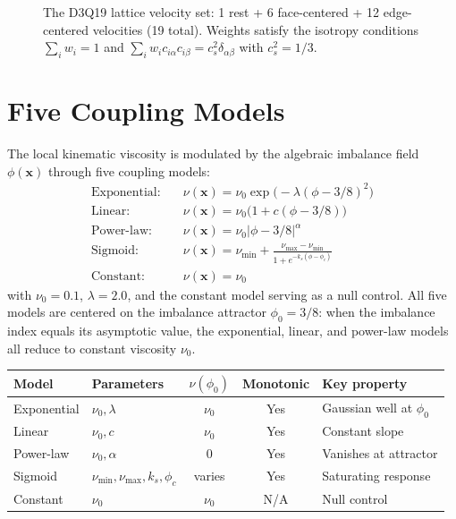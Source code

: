 \documentclass[12pt,openany]{report}
\theoremstyle{definition}
\theoremstyle{plain}
\theoremstyle{remark}
\begin{document}
\begin{figure}[htbp]
\centering

\caption{The D3Q19 lattice velocity set: 1 rest + 6 face-centered + 12
edge-centered velocities (19 total).  Weights satisfy the isotropy conditions
$\sum_i w_i = 1$ and $\sum_i w_i c_{i\alpha} c_{i\beta} = c_s^2
\delta_{\alpha\beta}$ with $c_s^2 = 1/3$.}
\label{fig:d3q19}
\end{figure}

\section{Five Coupling Models}
\label{sec:coupling-models}

The local kinematic viscosity is modulated by the algebraic imbalance
field $\phi(\mathbf{x})$ through five coupling models:
\begin{align}
  \text{Exponential:} \quad & \nu(\mathbf{x}) = \nu_0 \exp\bigl(-\lambda
    (\phi - 3/8)^2\bigr) \label{eq:coupling-exp} \\
  \text{Linear:} \quad & \nu(\mathbf{x}) = \nu_0 \bigl(1 + c(\phi - 3/8)\bigr) \\
  \text{Power-law:} \quad & \nu(\mathbf{x}) = \nu_0 |\phi - 3/8|^{\alpha} \\
  \text{Sigmoid:} \quad & \nu(\mathbf{x}) = \nu_{\min} +
    \frac{\nu_{\max} - \nu_{\min}}{1 + e^{-k_s(\phi - \phi_c)}} \\
  \text{Constant:} \quad & \nu(\mathbf{x}) = \nu_0
\end{align}
with $\nu_0 = 0.1$, $\lambda = 2.0$, and the constant model serving as a
null control.  All five models are centered on the imbalance attractor
$\phi_0 = 3/8$: when the imbalance index equals its asymptotic value, the
exponential, linear, and power-law models all reduce to constant
viscosity $\nu_0$.

\begin{center}
\begin{tabular}{llccl}
\toprule
\textbf{Model} & \textbf{Parameters} & $\nu(\phi_0)$ & \textbf{Monotonic} & \textbf{Key property} \\
\midrule
Exponential & $\nu_0, \lambda$ & $\nu_0$ & Yes & Gaussian well at $\phi_0$ \\
Linear      & $\nu_0, c$       & $\nu_0$ & Yes & Constant slope \\
Power-law   & $\nu_0, \alpha$  & $0$     & Yes & Vanishes at attractor \\
Sigmoid     & $\nu_{\min}, \nu_{\max}, k_s, \phi_c$ & varies & Yes & Saturating response \\
Constant    & $\nu_0$          & $\nu_0$ & N/A & Null control \\
\bottomrule
\end{tabular}
\end{center}
\end{document}

